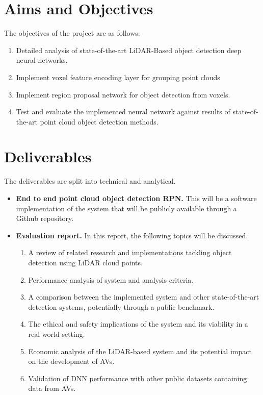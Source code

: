 \section{Aims and Objectives}
The objectives of the  project are as follows:
\begin{enumerate}
	\item Detailed analysis of state-of-the-art LiDAR-Based object detection deep neural networks.
	\item Implement voxel feature encoding layer for grouping point clouds
	\item Implement region proposal network for object detection from voxels.
	\item Test and evaluate the implemented neural network against results of state-of-the-art point cloud object detection methods.
\end{enumerate}

\section{Deliverables}

The deliverables are split into technical and analytical. 
\begin{itemize}
	 \item \textbf{End to end point cloud object detection RPN.} This will be a software implementation of the system that will be publicly available through a Github repository.
	\item \textbf{Evaluation report.} In this report, the following topics will be discussed. 
	\begin{enumerate}
		\item A review of related research and implementations tackling object detection using LiDAR cloud points. 
		\item Performance analysis of system and analysis criteria.
		\item A comparison between the implemented system and other state-of-the-art detection systems, potentially through a public benchmark. 
		\item The ethical and safety implications of the system and its viability in a real world setting. 
		\item Economic analysis of the LiDAR-based system and its potential impact on the development of AVs. 
		\item Validation of DNN performance with other public datasets containing data from AVs. 
	\end{enumerate}
\end{itemize}


